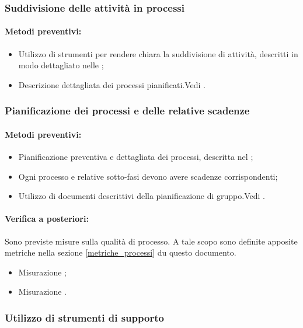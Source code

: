 \documentclass[12pt,a4paper]{article}
\begin{document}
\subsubsection{Suddivisione delle attività in processi}
\paragraph{Metodi preventivi:}
\begin{itemize}
	\item Utilizzo di strumenti per rendere chiara la suddivisione di attività, descritti in modo dettagliato nelle \NdP{};
	\item Descrizione dettagliata dei processi pianificati.Vedi \PdP{}.
\end{itemize}

\subsubsection{Pianificazione dei processi e delle relative scadenze}
\paragraph{Metodi preventivi:}
\begin{itemize}
	\item Pianificazione preventiva e dettagliata dei processi, descritta nel \PdP{};
	\item Ogni processo e relative sotto-fasi devono avere scadenze corrispondenti;
	\item Utilizzo di documenti descrittivi della pianificazione di gruppo.Vedi \PdP{}.
\end{itemize}
\paragraph{Verifica a posteriori:} Sono previste misure sulla qualità di processo. A tale scopo sono definite apposite metriche nella sezione \ref{metriche_processi} du questo documento.
\begin{itemize}
	\item Misurazione ;
	\item Misurazione .
\end{itemize}

\subsubsection{Utilizzo di strumenti di supporto}
\end{document}
